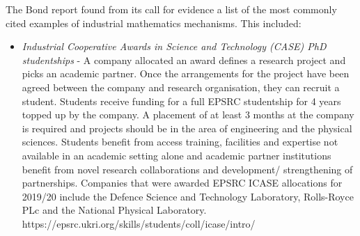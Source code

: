 \documentclass[11pt]{article} %
\begin{document}
	The Bond report \cite{Bond} found from its call for evidence a list of the most commonly cited examples of industrial mathematics mechanisms. This included: 
	\begin{itemize}
		\item \textit{Industrial Cooperative Awards in Science and Technology (CASE) PhD studentships }- A company allocated an award defines a research project and picks an academic partner. Once the arrangements for the project have been agreed between the company and research organisation, they can recruit a student. Students receive funding for a full EPSRC studentship for 4 years topped up by the company. A placement of at least 3 months at the company is required and projects should be in the area of engineering and the physical sciences. Students benefit from access training, facilities and expertise not available in an academic setting alone and academic partner institutions benefit from novel research collaborations and  development/ strengthening  of partnerships. Companies that were awarded EPSRC ICASE allocations for 2019/20 include the Defence Science and Technology Laboratory, Rolls-Royce PLc and the National Physical Laboratory. https://epsrc.ukri.org/skills/students/coll/icase/intro/
		

\end{itemize}
\end{document}
